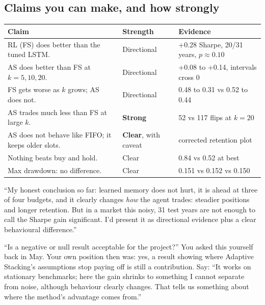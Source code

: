 \documentclass[11pt,a4paper]{article}
\begin{document}
\subsection{Claims you can make, and how strongly}

\begin{center}\small
\begin{tabular}{p{7.2cm}p{2.4cm}p{4.8cm}}
\toprule
Claim & Strength & Evidence \\
\midrule
RL (FS) does better than the tuned LSTM. & Directional & +0.28 Sharpe, 20/31 years,
  $p\approx0.10$ \\
AS does better than FS at $k=5,10,20$. & Directional & +0.08 to +0.14, intervals cross 0 \\
FS gets worse as $k$ grows; AS does not. & Directional & 0.48 to 0.31 vs 0.52 to 0.44 \\
AS trades much less than FS at large $k$. & \textbf{Strong} & 52 vs 117 flips at $k=20$ \\
AS does not behave like FIFO; it keeps older slots. & \textbf{Clear}, with caveat & corrected
  retention plot \\
Nothing beats buy and hold. & Clear & 0.84 vs 0.52 at best \\
Max drawdown: no difference. & Clear & 0.151 vs 0.152 vs 0.150 \\
\bottomrule
\end{tabular}
\end{center}

\begin{sayit}
``My honest conclusion so far: learned memory does not hurt, it is ahead at three of four
budgets, and it clearly changes \emph{how} the agent trades: steadier positions and longer
retention. But in a market this noisy, 31 test years are not enough to call the Sharpe gain
significant. I'd present it as directional evidence plus a clear behavioural difference.''
\end{sayit}

\begin{qa}{``Is a negative or null result acceptable for the project?''}
You asked this yourself back in May. Your own position then was: yes, a result showing where
Adaptive Stacking's assumptions stop paying off is still a contribution. Say: ``It works on
stationary benchmarks; here the gain shrinks to something I cannot separate from noise,
although behaviour clearly changes. That tells us something about where the method's
advantage comes from.''
\end{qa}
\end{document}
